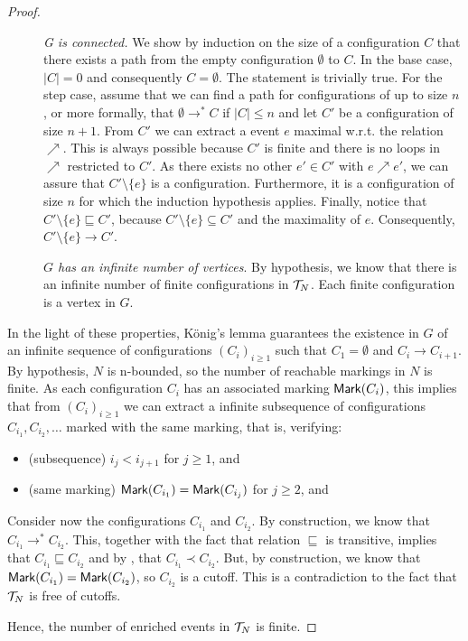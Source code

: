 \documentclass{article}
\begin{document}
\begin{proof}
\begin{description}
\item[] \emph{G is connected.}  We show by induction on the size of a
configuration $C$ that there exists a path from the empty configuration
$\emptyset$ to $C$.  In the base case, $|C| = 0$ and consequently $C =
\emptyset$.  The statement is trivially true.  For the step case, assume that
we can find a path for configurations of up to size $n$, or more formally, that
$\emptyset \to^* C$ if $|C| \le n$ and let $C'$ be a configuration of size
$n+1$.  From $C'$ we can extract a event $e$ maximal w.r.t. the relation
$\nearrow$.  This is always possible because $C'$ is finite and there is no
loops in $\nearrow$ restricted to $C'$.  As there exists no other $e' \in C'$
with $e \nearrow e'$, we can assure that $C' \setminus \{e\}$ is a
configuration.  Furthermore, it is a configuration of size $n$ for which the
induction hypothesis applies.  Finally, notice that $C' \setminus \{e\}
\sqsubseteq C'$, because $C' \setminus \{e\} \subseteq C'$ and the maximality
of $e$.  Consequently, $C' \setminus \{e\} \to C'$.

\item[] \emph{$G$ has an infinite number of vertices}.  By hypothesis, we know
that there is an infinite number of finite configurations in $\mathcal{T}_{N}$.  Each
finite configuration is a vertex in $G$.
\end{description}

In the light of these properties, K\"{o}nig's lemma guarantees the existence in
$G$ of an infinite sequence of configurations $(C_i)_{i \ge 1}$ such that $C_1
= \emptyset$ and $C_i \to C_{i+1}$.  By hypothesis, $N$ is n-bounded, so the
number of reachable markings in $N$ is finite.  As each configuration $C_i$ has
an associated marking $\mathsf{Mark }{(C_i)}$, this implies that from $(C_i)_{i \ge 1}$
we can extract a infinite subsequence of configurations $C_{i_1}, C_{i_2},
\ldots$ marked with the same marking, that is, verifying:

\begin{itemize}
\item (subsequence) $i_j < i_{j+1}$ for $j \ge 1$, and
\item (same marking) $\mathsf{Mark }{(C_{i_1})} = \mathsf{Mark }{(C_{i_j})}$ for $j \ge 2$, and
\end{itemize}

Consider now the configurations $C_{i_1}$ and $C_{i_2}$.  By construction, we
know that $C_{i_1} \to^* C_{i_2}$.  This, together with the fact that relation
$\sqsubseteq$ is transitive, implies that $C_{i_1} \sqsubseteq C_{i_2}$ and by
, that $C_{i_1} \prec C_{i_2}$.  But, by construction, we know
that $\mathsf{Mark }{(C_{i_1})} = \mathsf{Mark }{(C_{i_2})}$, so $C_{i_2}$ is a cutoff.  This
is a contradiction to the fact that $\mathcal{T}_{N}$ is free of cutoffs.

Hence, the number of enriched events in $\mathcal{T}_{N}$ is finite.
\end{proof}
\end{document}
